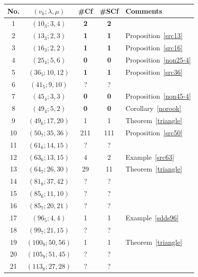 \documentclass[12pt, reqno]{amsart}
\begin{document}
\begin{table}
\begin{center}
\begin{tabular}{|c c c c l|}
\hline
No. & $(v_k;\lambda,\mu)$ & \#Cf & \#SCf & Comments\\
\hline
\rule{0mm}{4.5mm}1 & $(10_{3};3,4)$ & \textbf{2} & \textbf{2} & \\
\rule{0mm}{4.5mm}2 & $(13_{3};2,3)$ & \textbf{1} & \textbf{1} & Proposition~\ref{src13}\\
\rule{0mm}{4.5mm}3 & $(16_{3};2,2)$ & \textbf{1} & \textbf{1} & Proposition~\ref{src16}\\
\rule{0mm}{4.5mm}4 & $(25_{4};5,6)$ & \textbf{0} & \textbf{0} & Proposition~\ref{non25-4}\\
\rule{0mm}{4.5mm}5 & $(36_{5};10,12)$ & \textbf{1} & \textbf{1} &  Proposition~\ref{src36}\\
\rule{0mm}{4.5mm}6 & $(41_{5};9,10)$ & ? & ? & \\
\rule{0mm}{4.5mm}7 & $(45_{4};3,3)$ & \textbf{0} & \textbf{0} & Proposition~\ref{non45-4}\\
\rule{0mm}{4.5mm}8 & $(49_{4};5,2)$ & \textbf{0} & \textbf{0} & Corollary~\ref{norook} \\
\rule{0mm}{4.5mm}9 & $(49_{6};17,20)$ & 1 & 1 & Theorem~\ref{triangle}\\
\rule{0mm}{4.5mm}10 & $(50_{7};35,36)$ & 211 & 111 & Proposition~\ref{src50}\\
\rule{0mm}{4.5mm}11 & $(61_{6};14,15)$ & ? & ? & \\
\rule{0mm}{4.5mm}12 & $(63_{6};13,15)$ & 4 & 2 & Example~\ref{src63}\\
\rule{0mm}{4.5mm}13 & $(64_{7};26,30)$ & 29 & 11 & Theorem~\ref{triangle}\\
\rule{0mm}{4.5mm}14 & $(81_{8};37,42)$ & ? & ? & \\
\rule{0mm}{4.5mm}15 & $(85_{6};11,10)$ & ? & ? & \\
\rule{0mm}{4.5mm}16 & $(85_{7};20,21)$ & ? & ? & \\
\rule{0mm}{4.5mm}17 & $(96_{5};4,4)$ & 1 & 1 & Example~\ref{sdds96}\\
\rule{0mm}{4.5mm}18 & $(99_{7};21,15)$ & ? & ? & \\
\rule{0mm}{4.5mm}19 & $(100_{9};50,56)$ & 1 & 1 & Theorem~\ref{triangle}\\
\rule{0mm}{4.5mm}20 & $(105_{9};51,45)$ & ? & ? & \\
\rule{0mm}{4.5mm}21 & $(113_{8};27,28)$ & ? & ? & \\

\end{tabular}
\end{center}
\end{table}
\end{document}

